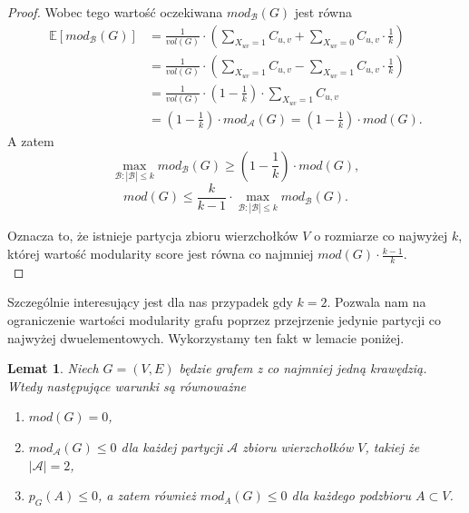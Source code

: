 \documentclass[letterpaper,12pt]{article}
\newtheorem{lemma}{Lemat}
\begin{document}
\begin{proof}
  Wobec tego wartość oczekiwana \(mod_{\mathcal{B}}(G)\) jest równa
  \begin{align*}
    \mathbb{E}[mod_{\mathcal{B}}(G)] & = \frac{1}{vol(G)} \cdot \left(\sum_{X_{uv} = 1} C_{u,v} + \sum_{X_{uv} = 0} C_{u,v} \cdot \frac{1}{k}\right) \\
                                     & = \frac{1}{vol(G)} \cdot \left(\sum_{X_{uv} = 1} C_{u,v} - \sum_{X_{uv} = 1} C_{u,v} \cdot \frac{1}{k}\right) \\
                                     & = \frac{1}{vol(G)} \cdot \left(1-\frac{1}{k}\right) \cdot \sum_{X_{uv} = 1} C_{u,v}                           \\
                                     & = \left(1-\frac{1}{k}\right) \cdot mod_{\mathcal{A}}(G) = \left(1-\frac{1}{k}\right) \cdot mod(G).
  \end{align*}
  A zatem
  \[\max_{\mathcal{B}:|\mathcal{B}|\leq k}mod_{\mathcal{B}}(G) \geq  \left(1-\frac{1}{k}\right) \cdot mod(G),\]
  \[mod(G) \leq \frac{k}{k-1} \cdot \max_{\mathcal{B}:|\mathcal{B}|\leq k}mod_{\mathcal{B}}(G).\]

  Oznacza to, że istnieje partycja zbioru wierzchołków \(V\) o rozmiarze co najwyżej \(k\), której wartość modularity score jest równa co najmniej \(mod(G) \cdot \frac{k-1}{k}\).\\
\end{proof}

Szczególnie interesujący jest dla nas przypadek gdy \(k=2\). Pozwala nam na ograniczenie wartości modularity grafu poprzez przejrzenie jedynie partycji co najwyżej dwuelementowych. Wykorzystamy ten fakt w lemacie poniżej.

\begin{lemma}
  \label{mod_eq}
  Niech \(G = (V,E)\) będzie grafem z co najmniej jedną krawędzią. Wtedy następujące warunki są równoważne
  \begin{enumerate}
    \item \(mod(G) = 0\),
    \item \(mod_{\mathcal{A}}(G) \leq 0\) dla każdej partycji \(\mathcal{A}\) zbioru wierzchołków \(V\), takiej że \(|\mathcal{A}| = 2\),
    \item \(p_G(A) \leq 0\), a zatem również \(mod_A(G) \leq 0\) dla każdego podzbioru \(A \subset V\).
  \end{enumerate}
\end{lemma}
\end{document}
